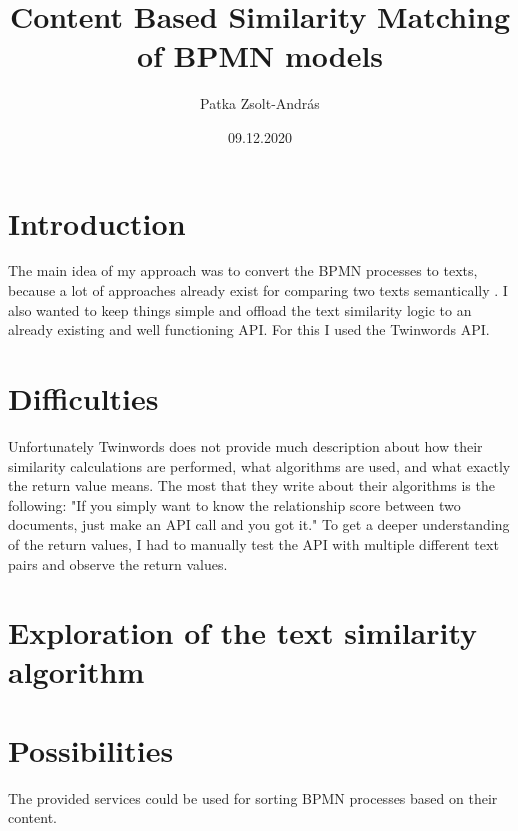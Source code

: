 \documentclass[12pt]{article}
\title{\vspace{-2cm}Content Based Similarity Matching of BPMN models}
\date{\vspace{-1.5cm}09.12.2020}
\author{\vspace{-2cm}Patka Zsolt-András}
\begin{document}
\maketitle

\section{Introduction}

The main idea of my approach was to convert the BPMN processes to texts, because a lot of approaches already exist for comparing two texts semantically \cite{gomaa2013survey}. I also wanted to keep things simple and offload the text similarity logic to an already existing and well functioning API. For this I used the Twinwords API.

\section{Difficulties}

Unfortunately Twinwords does not provide much description about how their similarity calculations are performed, what algorithms are used, and what exactly the return value means. The most that they write about their algorithms is the following: "If you simply want to know the relationship score between two documents, just make an API call and you got it." To get a deeper understanding of the return values, I had to manually test the API with multiple different text pairs and observe the return values.


\section{Exploration of the text similarity algorithm}




\section{Possibilities}

The provided services could be used for sorting BPMN processes based on their content. 




\end{document}
